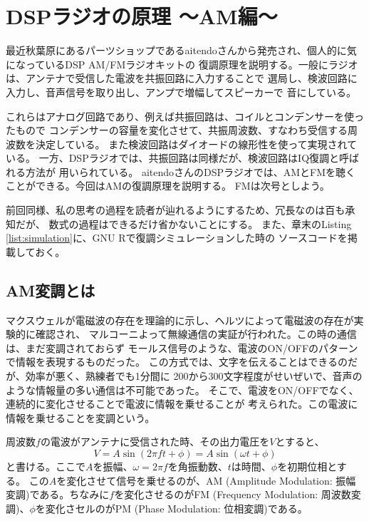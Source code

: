 \chapter*{DSPラジオの原理 〜AM編〜}
最近秋葉原にあるパーツショップであるaitendoさんから発売され、個人的に気になっているDSP AM/FMラジオキットの
復調原理を説明する。一般にラジオは、アンテナで受信した電波を共振回路に入力することで
選局し、検波回路に入力し、音声信号を取り出し、アンプで増幅してスピーカーで
音にしている。

これらはアナログ回路であり、例えば共振回路は、コイルとコンデンサーを使ったもので
コンデンサーの容量を変化させて、共振周波数、すなわち受信する周波数を決定している。
また検波回路はダイオードの線形性を使って実現されている。
一方、DSPラジオでは、共振回路は同様だが、検波回路はIQ復調と呼ばれる方法が
用いられている。
aitendoさんのDSPラジオでは、AMとFMを聴くことができる。今回はAMの復調原理を説明する。
FMは次号としよう。

前回同様、私の思考の過程を読者が辿れるようにするため、冗長なのは百も承知だが、
数式の過程はできるだけ省かないことにする。
また、章末のListing \ref{list:simulation}に、GNU Rで復調シミュレーションした時の
ソースコードを掲載しておく。

\section*{AM変調とは}
マクスウェルが電磁波の存在を理論的に示し、ヘルツによって電磁波の存在が実験的に確認され、
マルコーニよって無線通信の実証が行われた。この時の通信は、まだ変調されておらず
モールス信号のような、電波のON/OFFのパターンで情報を表現するものだった。
この方式では、文字を伝えることはできるのだが、効率が悪く、熟練者でも1分間に
200から300文字程度がせいぜいで、音声のような情報量の多い通信は不可能であった。
そこで、電波をON/OFFでなく、連続的に変化させることで電波に情報を乗せることが
考えられた。この電波に情報を乗せることを変調という。

周波数$f$の電波がアンテナに受信された時、その出力電圧を$V$とすると、
\begin{equation}
V = A\sin(2 \pi f t + \phi) = A\sin(\omega t + \phi)
\end{equation}
と書ける。ここで$A$を振幅、$\omega=2\pi f$を角振動数、$t$は時間、$\phi$を初期位相とする。
この$A$を変化させて信号を乗せるのが、AM (Amplitude Modulation: 振幅変調)である。ちなみに$f$を変化させるのがFM (Frequency Modulation: 周波数変調)、$\phi$を変化さセルのがPM (Phase Modulation: 位相変調)である。

